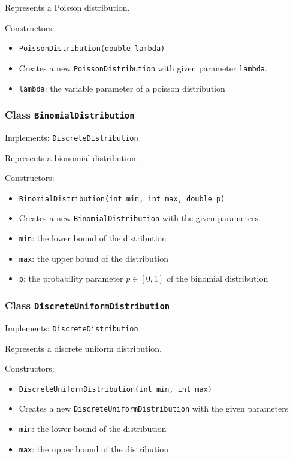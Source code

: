 \documentclass[parskip=full,11pt]{scrartcl}
\begin{document}
Represents a Poisson distribution.

Constructors:
\begin{itemize}\itemsep -10pt
\item \texttt{PoissonDistribution(double lambda)}
\item[] Creates a new \texttt{PoissonDistribution} with given parameter \texttt{lambda}.
\item[] \texttt{lambda}: the variable parameter of a poisson distribution
\end{itemize}

\subsubsection{Class \texttt{BinomialDistribution}}
Implements: \texttt{DiscreteDistribution}

Represents a bionomial distribution.

Constructors:
\begin{itemize}\itemsep -10pt
\item \texttt{BinomialDistribution(int min, int max, double p)}
\item[] Creates a new \texttt{BinomialDistribution} with the given parameters.
\item[] \texttt{min}: the lower bound of the distribution
\item[] \texttt{max}: the upper bound of the distribution
\item[] \texttt{p}: the probability parameter \(p \in [0,1]\) of the binomial distribution
\end{itemize}

\subsubsection{Class \texttt{DiscreteUniformDistribution}}
Implements: \texttt{DiscreteDistribution}

Represents a discrete uniform distribution.

Constructors:
\begin{itemize}\itemsep -10pt
\item \texttt{DiscreteUniformDistribution(int min, int max)}
\item[] Creates a new \texttt{DiscreteUniformDistribution} with the given parameters
\item[] \texttt{min}: the lower bound of the distribution
\item[] \texttt{max}: the upper bound of the distribution
\end{itemize}
\end{document}
